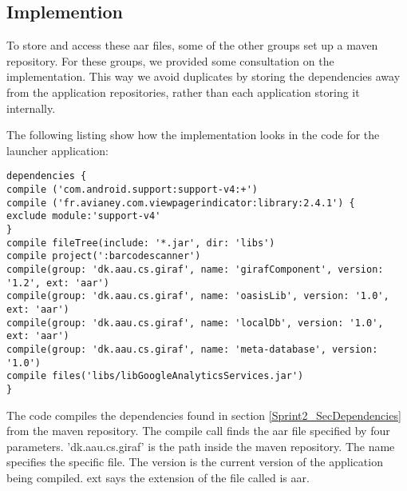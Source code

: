 \subsection{Implemention}
To store and access these aar files, some of the other groups set up a maven repository. For these groups, we provided some consultation on the implementation. This way we avoid duplicates by storing the dependencies away from the application repositories, rather than each application storing it internally.

The following listing show how the implementation looks in the code for the launcher application:
\begin{lstlisting}
dependencies {
compile ('com.android.support:support-v4:+')
compile ('fr.avianey.com.viewpagerindicator:library:2.4.1') {
exclude module:'support-v4'
}
compile fileTree(include: '*.jar', dir: 'libs')
compile project(':barcodescanner')
compile(group: 'dk.aau.cs.giraf', name: 'girafComponent', version: '1.2', ext: 'aar')
compile(group: 'dk.aau.cs.giraf', name: 'oasisLib', version: '1.0', ext: 'aar')
compile(group: 'dk.aau.cs.giraf', name: 'localDb', version: '1.0', ext: 'aar')
compile(group: 'dk.aau.cs.giraf', name: 'meta-database', version: '1.0')
compile files('libs/libGoogleAnalyticsServices.jar')
}
\end{lstlisting}

The code compiles the dependencies found in section \ref{Sprint2_SecDependencies} from the maven repository. The compile call finds the aar file specified by four parameters. 'dk.aau.cs.giraf' is the path inside the maven repository. The name specifies the specific file. The version is the current version of the application being compiled. ext says the extension of the file called is aar.